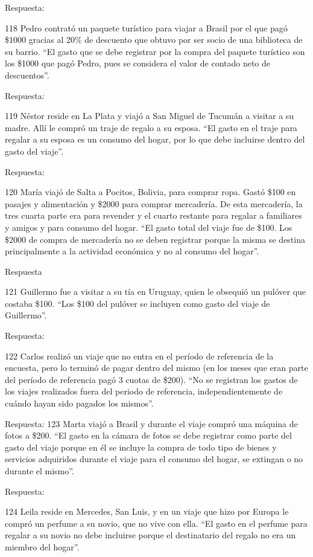\documentclass[
  openany]{book}
\begin{document}
Respuesta:

118 Pedro contrató un paquete turístico para viajar a Brasil por el que pagó \$1000 gracias al 20\% de descuento que obtuvo por ser socio de una biblioteca de su barrio. ``El gasto que se debe registrar por la compra del paquete turístico son los \$1000 que pagó Pedro, pues se considera el valor de contado neto de descuentos''.

Respuesta:

119 Néstor reside en La Plata y viajó a San Miguel de Tucumán a visitar a su madre. Allí le compró un traje de regalo a su esposa. ``El gasto en el traje para regalar a su esposa es un consumo del hogar, por lo que debe incluirse dentro del gasto del viaje''.

Respuesta:

120 María viajó de Salta a Pocitos, Bolivia, para comprar ropa. Gastó \$100 en pasajes y alimentación y \$2000 para comprar mercadería. De esta mercadería, la tres cuarta parte era para revender y el cuarto restante para regalar a familiares y amigos y para consumo del hogar. ``El gasto total del viaje fue de \$100. Los \$2000 de compra de mercadería no se deben registrar porque la misma se destina principalmente a la actividad económica y no al consumo del hogar''.

Respuesta

121 Guillermo fue a visitar a su tía en Uruguay, quien le obsequió un pulóver que costaba \$100. ``Los \$100 del pulóver se incluyen como gasto del viaje de Guillermo''.

Respuesta:

122 Carlos realizó un viaje que no entra en el período de referencia de la encuesta, pero lo terminó de pagar dentro del mismo (en los meses que eran parte del período de referencia pagó 3 cuotas de \$200). ``No se registran los gastos de los viajes realizados fuera del periodo de referencia, independientemente de cuándo hayan sido pagados los mismos''.

Respuesta: 123 Marta viajó a Brasil y durante el viaje compró una máquina de fotos a \$200. ``El gasto en la cámara de fotos se debe registrar como parte del gasto del viaje porque en él se incluye la compra de todo tipo de bienes y servicios adquiridos durante el viaje para el consumo del hogar, se extingan o no durante el mismo''.

Respuesta:

124 Leila reside en Mercedes, San Luis, y en un viaje que hizo por Europa le compró un perfume a su novio, que no vive con ella. ``El gasto en el perfume para regalar a su novio no debe incluirse porque el destinatario del regalo no era un miembro del hogar''.
\end{document}
